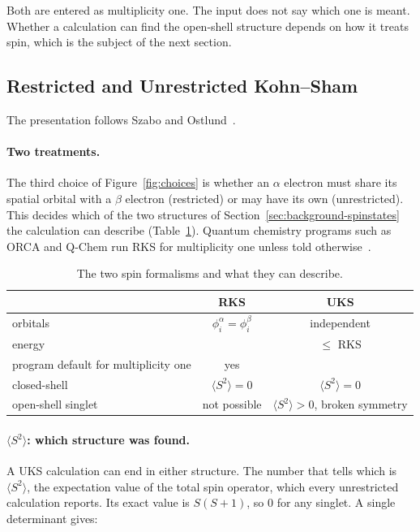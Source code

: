 Both are entered as multiplicity one. The input does not say which one is
meant. Whether a calculation can find the open-shell structure depends on
how it treats spin, which is the subject of the next section.

\subsection{Restricted and Unrestricted Kohn--Sham}
\label{sec:background-spin}

The presentation follows Szabo and Ostlund~\cite{szabo1996}.

\paragraph{Two treatments.} The third choice of Figure~\ref{fig:choices}
is whether an $\alpha$ electron must share its spatial orbital with a
$\beta$ electron (restricted) or may have its own (unrestricted). This
decides which of the two structures of
Section~\ref{sec:background-spinstates} the calculation can describe
(Table~\ref{tab:rks-uks}). Quantum chemistry programs such as ORCA and
Q-Chem run RKS for multiplicity one unless told
otherwise~\cite{orca_manual, qchem_manual}.

\begin{table}[h]
\centering
\small
\caption{The two spin formalisms and what they can describe.}
\label{tab:rks-uks}
\begin{tabular}{@{}lcc@{}}
\toprule
 & RKS & UKS \\
\midrule
orbitals & $\phi_i^{\alpha} = \phi_i^{\beta}$ & independent \\
energy & & $\le$ RKS \\
program default for multiplicity one & yes & \\
\midrule
closed-shell & $\langle S^2 \rangle = 0$ & $\langle S^2 \rangle = 0$ \\
open-shell singlet & not possible & $\langle S^2 \rangle > 0$, broken symmetry \\
\bottomrule
\end{tabular}
\end{table}

\paragraph{$\langle S^2 \rangle$: which structure was found.} A UKS
calculation can end in either structure. The number that tells which is
$\langle S^2 \rangle$, the expectation value of the total spin operator,
which every unrestricted calculation reports. Its exact value is $S(S+1)$,
so 0 for any singlet. A single determinant gives:

